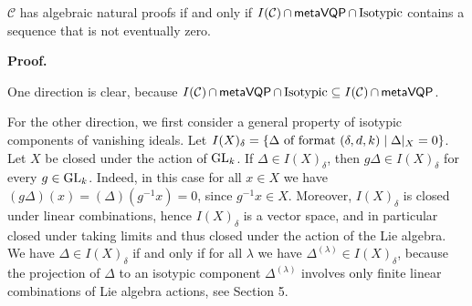 \documentclass[10pt,a4paper]{article}
\begin{document}
$\mathcal{C}$ has algebraic natural proofs if and only if $I(\mathcal{C})\mathop{\cap}\mathsf{metaVQP}\mathop{\cap}\textup{{Isotypic}}$ contains a sequence that is not eventually zero.






\par\medskip\noindent\textbf{Proof.}\par




One direction is clear, because $I(\mathcal{C})\mathop{\cap}\mathsf{metaVQP}\mathop{\cap}\textup{{Isotypic}}\subseteq I(\mathcal{C})\mathop{\cap}\mathsf{metaVQP}$.





For the other direction, we first consider a general property of isotypic components of vanishing ideals.
Let $I(X)_{\delta}=\{\Delta\textup{ of format $(\delta,d,k)$}\mid\Delta|_{X}=0\}$.
Let $X$ be closed under the action of $\textnormal{GL}_{k}$.
If $\Delta\in I(X)_{\delta}$, then $g\Delta\in I(X)_{\delta}$ for every $g\in\textnormal{GL}_{k}$.
Indeed, in this case for all $x\in X$ we have $(g\Delta)(x)=(\Delta)(g^{-1}x)=0$, since $g^{-1}x\in X$.
Moreover, $I(X)_{\delta}$ is closed under linear combinations, hence $I(X)_{\delta}$ is a vector space, and in particular closed under taking limits and thus closed under the action of the Lie algebra.
We have $\Delta\in I(X)_{\delta}$ if and only if for all $\lambda$ we have $\Delta^{(\lambda)}\in I(X)_{\delta}$, because the projection of $\Delta$ to an isotypic component $\Delta^{(\lambda)}$ involves only finite linear combinations of Lie algebra actions, see Section 5.
\end{document}
